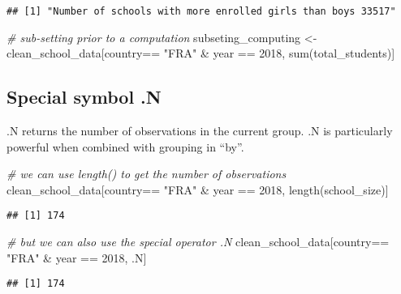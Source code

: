 \documentclass[
]{article}
\newenvironment{Shaded}{\begin{snugshade}}{\end{snugshade}}
\newcommand{\CommentTok}[1]{\textcolor[rgb]{0.56,0.35,0.01}{\textit{#1}}}
\newcommand{\DecValTok}[1]{\textcolor[rgb]{0.00,0.00,0.81}{#1}}
\newcommand{\FunctionTok}[1]{\textcolor[rgb]{0.00,0.00,0.00}{#1}}
\newcommand{\NormalTok}[1]{#1}
\newcommand{\OtherTok}[1]{\textcolor[rgb]{0.56,0.35,0.01}{#1}}
\newcommand{\SpecialCharTok}[1]{\textcolor[rgb]{0.00,0.00,0.00}{#1}}
\newcommand{\StringTok}[1]{\textcolor[rgb]{0.31,0.60,0.02}{#1}}
\begin{document}
\begin{verbatim}
## [1] "Number of schools with more enrolled girls than boys 33517"
\end{verbatim}

\begin{Shaded}
\begin{Highlighting}[]
\CommentTok{\# sub{-}setting prior to a computation}
\NormalTok{subseting\_computing }\OtherTok{\textless{}{-}}\NormalTok{ clean\_school\_data[country}\SpecialCharTok{==} \StringTok{"FRA"} \SpecialCharTok{\&}\NormalTok{ year }\SpecialCharTok{==} \DecValTok{2018}\NormalTok{, }\FunctionTok{sum}\NormalTok{(total\_students)]}
\end{Highlighting}
\end{Shaded}

\hypertarget{special-symbol-.n}{%
\subsection{Special symbol .N}\label{special-symbol-.n}}

.N returns the number of observations in the current group. .N is
particularly powerful when combined with grouping in ``by''.

\begin{Shaded}
\begin{Highlighting}[]
\CommentTok{\# we can use length() to get the number of observations}
\NormalTok{clean\_school\_data[country}\SpecialCharTok{==} \StringTok{"FRA"} \SpecialCharTok{\&}\NormalTok{ year }\SpecialCharTok{==} \DecValTok{2018}\NormalTok{, }\FunctionTok{length}\NormalTok{(school\_size)] }
\end{Highlighting}
\end{Shaded}

\begin{verbatim}
## [1] 174
\end{verbatim}

\begin{Shaded}
\begin{Highlighting}[]
\CommentTok{\# but we can also use the special operator .N}
\NormalTok{clean\_school\_data[country}\SpecialCharTok{==} \StringTok{"FRA"} \SpecialCharTok{\&}\NormalTok{ year }\SpecialCharTok{==} \DecValTok{2018}\NormalTok{, .N]}
\end{Highlighting}
\end{Shaded}

\begin{verbatim}
## [1] 174
\end{verbatim}
\end{document}
